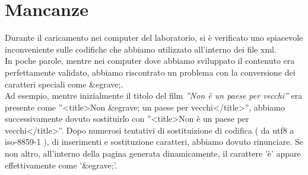 \section{Mancanze}
Durante il caricamento nei computer del laboratorio, si è verificato uno spiacevole inconveniente sulle codifiche che abbiamo utilizzato all'interno dei file xml.\\
In poche parole, mentre nei computer dove abbiamo sviluppato il contenuto era perfettamente validato, abbiamo riscontrato un problema con la conversione dei caratteri speciali come \&egrave;.\\
Ad esempio, mentre inizialmente il titolo del film \textit{''Non è un paese per vecchi''} era presente come ''<title>Non \&egrave; un paese per vecchi</title>'', abbiamo successivamente dovuto sostituirlo con ''<title>Non è un paese per vecchi</title>''. Dopo numerosi tentativi di sostituizione di codifica ( da utf8 a iso-8859-1 ), di inserimenti e sostituzione caratteri, abbiamo dovuto rinunciare. Se non altro, all'interno della pagina generata dinamicamente, il carattere 'è' appare effettivamente come '\&egrave;'.

 


